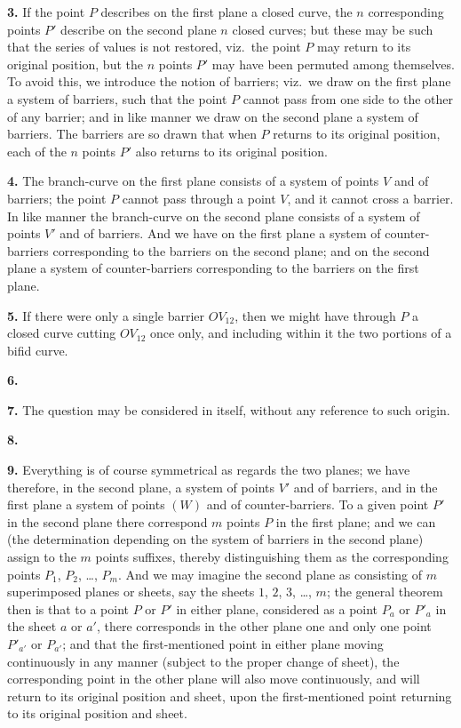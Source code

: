 \documentclass[12pt,a4paper]{article}
\theoremstyle{definition}
\begin{document}
\medskip
\noindent\textbf{3.}\quad
If the point $P$ describes on the first plane a closed curve, the $n$ corresponding points $P'$ describe on the second plane $n$ closed curves; but these may be such that the series of values is not restored, viz.\ the point $P$ may return to its original position, but the $n$ points $P'$ may have been permuted among themselves. To avoid this, we introduce the notion of barriers; viz.\ we draw on the first plane a system of barriers, such that the point $P$ cannot pass from one side to the other of any barrier; and in like manner we draw on the second plane a system of barriers. The barriers are so drawn that when $P$ returns to its original position, each of the $n$ points $P'$ also returns to its original position.

\medskip
\noindent\textbf{4.}\quad
The branch-curve on the first plane consists of a system of points $V$ and of barriers; the point $P$ cannot pass through a point $V$, and it cannot cross a barrier. In like manner the branch-curve on the second plane consists of a system of points $V'$ and of barriers. And we have on the first plane a system of counter-barriers corresponding to the barriers on the second plane; and on the second plane a system of counter-barriers corresponding to the barriers on the first plane.

\medskip
\noindent\textbf{5.}\quad
If there were only a single barrier $OV_{12}$, then we might have through $P$ a closed curve cutting $OV_{12}$ once only, and including within it the two portions of a bifid curve.

\medskip
\noindent\textbf{6.}

\medskip
\noindent\textbf{7.}\quad
The question may be considered in itself, without any reference to such origin.

\medskip
\noindent\textbf{8.}

\medskip
\noindent\textbf{9.}\quad
Everything is of course symmetrical as regards the two planes; we have therefore, in the second plane, a system of points $V'$ and of barriers, and in the first plane a system of points $(W)$ and of counter-barriers. To a given point $P'$ in the second plane there correspond $m$ points $P$ in the first plane; and we can (the determination depending on the system of barriers in the second plane) assign to the $m$ points suffixes, thereby distinguishing them as the corresponding points $P_1$, $P_2$, \dots, $P_m$. And we may imagine the second plane as consisting of $m$ superimposed planes or sheets, say the sheets $1$, $2$, $3$, \dots, $m$; the general theorem then is that to a point $P$ or $P'$ in either plane, considered as a point $P_a$ or $P'_a$ in the sheet $a$ or $a'$, there corresponds in the other plane one and only one point $P'_{a'}$ or $P_{a'}$; and that the first-mentioned point in either plane moving continuously in any manner (subject to the proper change of sheet), the corresponding point in the other plane will also move continuously, and will return to its original position and sheet, upon the first-mentioned point returning to its original position and sheet.
\end{document}
